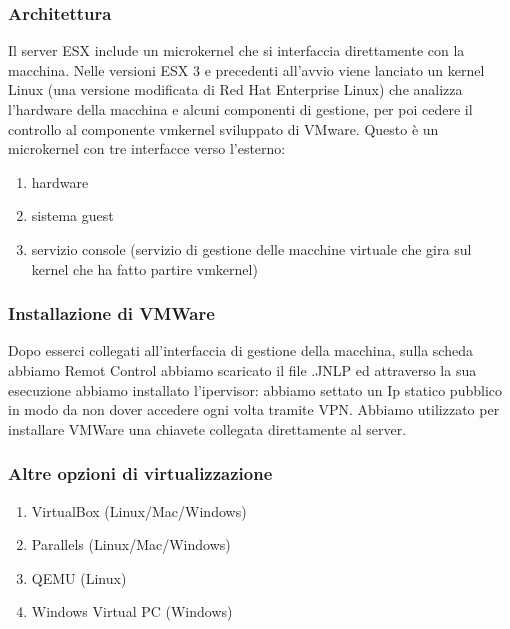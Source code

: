 \documentclass{article}
\begin{document}
\subsubsection{Architettura}
Il server ESX include un microkernel che si interfaccia direttamente con la macchina. Nelle versioni ESX 3 e precedenti all'avvio viene lanciato un kernel Linux (una versione modificata di Red Hat Enterprise Linux) che analizza l'hardware della macchina e alcuni componenti di gestione, per poi cedere il controllo al componente vmkernel sviluppato di VMware. Questo è un microkernel con tre interfacce verso l'esterno:
\begin{enumerate}
    \item hardware
    \item sistema guest
    \item servizio console (servizio di gestione delle macchine virtuale che gira sul kernel che ha fatto partire vmkernel)
\end{enumerate}

\subsubsection{Installazione di VMWare} 
    Dopo esserci collegati all'interfaccia di gestione della macchina, sulla scheda abbiamo
    Remot Control abbiamo scaricato il file .JNLP ed attraverso la sua esecuzione
    abbiamo installato l'ipervisor: abbiamo settato un Ip statico pubblico in modo da non dover
    accedere ogni volta tramite VPN. Abbiamo utilizzato per installare VMWare una chiavete collegata direttamente al server.
    
\subsubsection{Altre opzioni di virtualizzazione}
\begin{enumerate}
    \item VirtualBox (Linux/Mac/Windows)
    \item Parallels (Linux/Mac/Windows)
    \item QEMU (Linux)
    \item Windows Virtual PC (Windows)

\end{enumerate}
\end{document}

